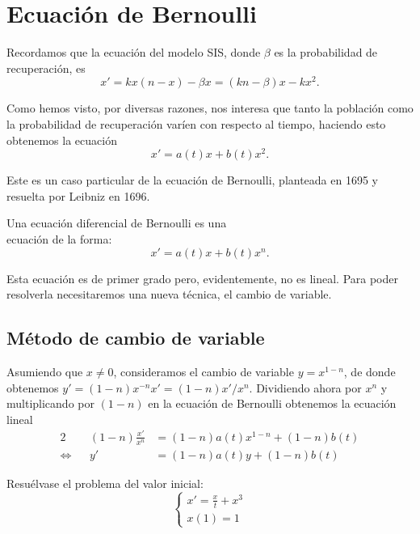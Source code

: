\documentclass[../ecuaciones_diferenciales.tex]{subfiles}
\begin{document}
\section{Ecuación de Bernoulli}

Recordamos que la ecuación del modelo SIS, donde \(\beta\) es la probabilidad de
recuperación, es
\[x' = k x(n - x) - \beta x = (kn - \beta)x - kx^2.\]

Como hemos visto, por diversas razones, nos interesa que tanto la población como
la probabilidad de recuperación varíen con respecto al tiempo, haciendo esto
obtenemos la ecuación
\[x' = a(t)x + b(t)x^2.\]

Este es un caso particular de la ecuación de Bernoulli, planteada en 1695 y
resuelta por Leibniz en 1696.

\begin{definition}
	Una ecuación diferencial de Bernoulli es una \\ %
	ecuación de la forma:
	\[x' = a(t)x + b(t)x^n.\]
\end{definition}

Esta ecuación es de primer grado pero, evidentemente, no es lineal. Para poder
resolverla necesitaremos una nueva técnica, el cambio de variable.

\subsection{Método de cambio de variable}

Asumiendo que \(x \neq 0\), consideramos el cambio de variable
\(y = x^{1 - n}\), de donde obtenemos
\(y' = (1 - n) x^{-n} x' = (1 - n)x'/x^n\). Dividiendo ahora por \(x^n\) y
multiplicando por \((1 - n)\) en la ecuación de Bernoulli obtenemos la ecuación
lineal
\begin{alignat*}{2}
	     &  & (1 - n)\frac{x'}{x^n} & = (1-n)a(t)x^{1-n} + (1-n)b(t) \\
	\iff &  & y'                    & = (1 - n)a(t)y + (1 - n)b(t)
\end{alignat*}

\begin{example}
	\label{ex:cambio_var}
	Resuélvase el problema del valor inicial:
	\[\begin{cases}
			x' = \frac{x}{t} + x^3 \\
			x(1) = 1
		\end{cases}\]
\end{example}
\end{document}
